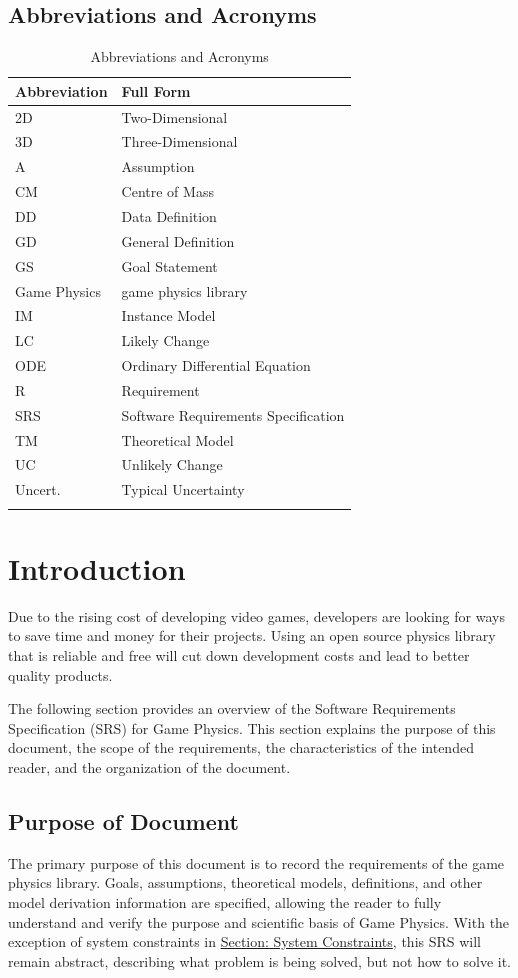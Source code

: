 \documentclass[12pt]{article}
\begin{document}
\subsection{Abbreviations and Acronyms}
\label{Sec:TAbbAcc}
\begin{longtable}{l l}
\toprule
\textbf{Abbreviation} & \textbf{Full Form}
\\
\midrule
\endhead
2D & Two-Dimensional
\\
3D & Three-Dimensional
\\
A & Assumption
\\
CM & Centre of Mass
\\
DD & Data Definition
\\
GD & General Definition
\\
GS & Goal Statement
\\
Game Physics & game physics library
\\
IM & Instance Model
\\
LC & Likely Change
\\
ODE & Ordinary Differential Equation
\\
R & Requirement
\\
SRS & Software Requirements Specification
\\
TM & Theoretical Model
\\
UC & Unlikely Change
\\
Uncert. & Typical Uncertainty
\\
\bottomrule
\caption{Abbreviations and Acronyms}
\label{Table:TAbbAcc}
\end{longtable}
\section{Introduction}
\label{Sec:Intro}
Due to the rising cost of developing video games, developers are looking for ways to save time and money for their projects. Using an open source physics library that is reliable and free will cut down development costs and lead to better quality products.

The following section provides an overview of the Software Requirements Specification (SRS) for Game Physics. This section explains the purpose of this document, the scope of the requirements, the characteristics of the intended reader, and the organization of the document.

\subsection{Purpose of Document}
\label{Sec:DocPurpose}
The primary purpose of this document is to record the requirements of the game physics library. Goals, assumptions, theoretical models, definitions, and other model derivation information are specified, allowing the reader to fully understand and verify the purpose and scientific basis of Game Physics. With the exception of system constraints in \hyperref[Sec:SysConstraints]{Section: System Constraints}, this SRS will remain abstract, describing what problem is being solved, but not how to solve it.
\end{document}
